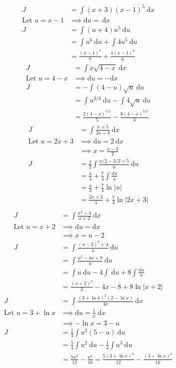 \documentclass{article}
\theoremstyle{plain}
\theoremstyle{definition}
\begin{document}
\begin{align*}
	J&=\int (x+3){(x-1)}^5\ \text{d}x \\
	\text{Let } u = x-1 &\implies \text{d}u = \ \text{d}x \\
	J&=\int (u+4)u^5\ \text{d}u \\
	 &= \int u^6 \ \text{d}u + \int 4u^5\ \text{d}u \\
	 &= \frac{{(x-1)}^7}{7} + \frac{4{(x-1)}^6}{6}
\end{align*}
\begin{align*}
	J&=\int x \sqrt{4-x}\ \text{d}x \\
	\text{Let } u = 4-x &\implies \text{d}u = - \text{d}x \\
	J&= -\int (4-u)\sqrt{u}\ \text{d}u \\
	 &= \int u^{3/2}\ \text{d}u - \int 4\sqrt{u} \ \text{d}u \\
	 &= \frac{2{(4-x)}^{5/2}}{5} - \frac{8{(4-x)}^{3/2}}{3}
\end{align*}
\begin{align*}
	J&=\int \frac{x+5}{2x+3}\ \text{d}x \\
	\text{Let } u = 2x+3 &\implies \text{d}u = 2\ \text{d}x \\
						 &\implies x = \frac{u-3}{2} \\
	J&= \frac{1}{2}\int \frac{u/2-3/2+5}{u}\ \text{d}u \\
	 &= \frac{u}{4} + \frac{7}{4}\int \frac{\text{d}u}{u}  \\
	 &= \frac{u}{4} + \frac{7}{4}\ln |u|  \\
	 &= \frac{2x+3}{4} + \frac{7}{4}\ln |2x+3|  \\
\end{align*}
\begin{align*}
	J&=\int \frac{x^2+4}{x+2}\ \text{d}x \\
	\text{Let } u = x+2 &\implies \text{d}u = \text{d}x \\
						&\implies x = u-2 \\
	J&= \int \frac{{(u-2)}^2+4}{u}\ \text{d}u \\
	 &= \int \frac{u^2-4u+8}{u}\ \text{d}u \\
	 &= \int u\ \text{d}u -4 \int\ \text{d}u+8\int\frac{\text{d}u}{u} \\
	 &= \frac{{(x+2)}^2}{2} -4x-8+8 \ln \left|x+2\right|
\end{align*}
\begin{align*}
	J&=\int \frac{{(3 +\ln x)}^2(2-\ln x)}{4x}\ \text{d}x \\
	\text{Let } u = 3+\ln x &\implies \text{d}u =\frac{1}{x} \ \text{d}x \\
						&\implies -\ln x = 3-u \\
	J&= \frac{1}{4}\int u^2(5-u)\ \text{d}u \\
	 &= \frac{5}{4}\int u^2\ \text{d}u -\frac{1}{4}\int u^3\ \text{d}u \\
	 &= \frac{5u^3}{12}-\frac{u^4}{16} =\frac{5{(3+\ln x)}^3}{12}
										-\frac{{(3+\ln x)}^4}{16}
\end{align*}
\end{document}
